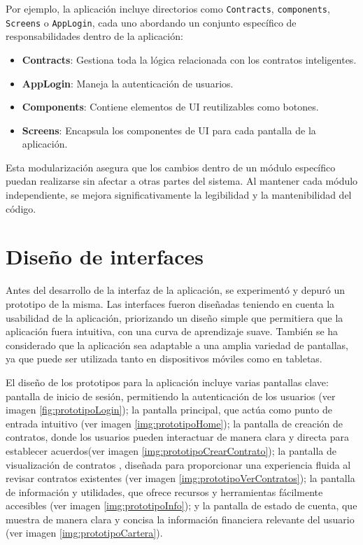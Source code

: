 Por ejemplo, la aplicación incluye directorios como \texttt{Contracts}, \texttt{components}, \texttt{Screens} o \texttt{AppLogin}, cada uno abordando un conjunto específico de responsabilidades dentro de la aplicación:

\begin{itemize}
\item \textbf{Contracts}: Gestiona toda la lógica relacionada con los contratos inteligentes.

\item \textbf{AppLogin}: Maneja la autenticación de usuarios.

\item \textbf{Components}: Contiene elementos de UI reutilizables como botones.

\item \textbf{Screens}: Encapsula los componentes de UI para cada pantalla de la aplicación.
\end{itemize}

Esta modularización asegura que los cambios dentro de un módulo específico puedan realizarse sin afectar a otras partes del sistema. Al mantener cada módulo independiente, se mejora significativamente la legibilidad y la mantenibilidad del código.

\section{Diseño de interfaces}

Antes del desarrollo de la interfaz de la aplicación, se experimentó y depuró un prototipo de la misma.
Las interfaces fueron diseñadas teniendo en cuenta la usabilidad de la aplicación, priorizando un diseño simple que permitiera que la aplicación fuera intuitiva, con una curva de aprendizaje suave.
También se ha considerado que la aplicación sea adaptable a una amplia variedad de pantallas, ya que puede ser utilizada tanto en dispositivos móviles como en tabletas.

El diseño de los prototipos para la aplicación incluye varias pantallas clave: pantalla de inicio de sesión, permitiendo la autenticación de los usuarios (ver imagen \ref{fig:prototipoLogin}); la pantalla principal, que actúa como punto de entrada intuitivo (ver imagen \ref{img:prototipoHome}); la pantalla de creación de contratos, donde los usuarios pueden interactuar de manera clara y directa para establecer acuerdos(ver imagen \ref{img:prototipoCrearContrato}); la pantalla de visualización de contratos , diseñada para proporcionar una experiencia fluida al revisar contratos existentes (ver imagen \ref{img:prototipoVerContratos}); la pantalla de información y utilidades, que ofrece recursos y herramientas fácilmente accesibles (ver imagen \ref{img:prototipoInfo}); y la pantalla de estado de cuenta, que muestra de manera clara y concisa la información financiera relevante del usuario (ver imagen \ref{img:prototipoCartera}). 

